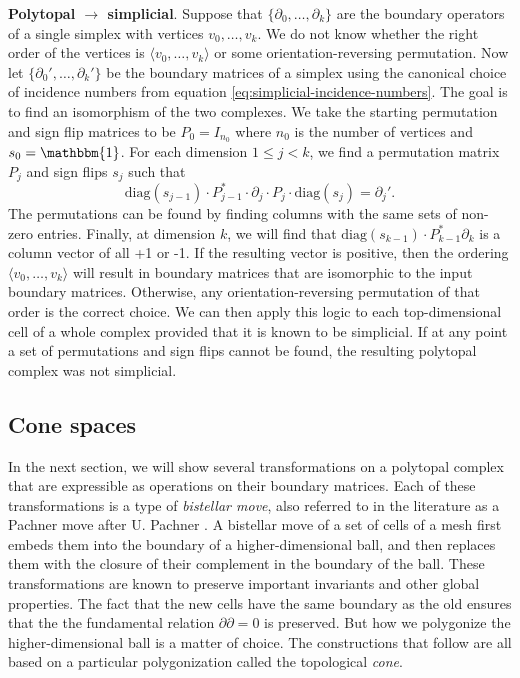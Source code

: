 \documentclass[twocolumn,leqno,twocolumn]{article}
\begin{document}
\textbf{Polytopal $\rightarrow$ simplicial}.
Suppose that $\{\partial_0, \ldots, \partial_k\}$ are the boundary operators of a single simplex with vertices $v_0, \ldots, v_k$.
We do not know whether the right order of the vertices is $\langle v_0,\ldots,v_k\rangle$ or some orientation-reversing permutation.
Now let $\{\partial_0',\ldots,\partial_k'\}$ be the boundary matrices of a simplex using the canonical choice of incidence numbers from equation \eqref{eq:simplicial-incidence-numbers}.
The goal is to find an isomorphism of the two complexes.
We take the starting permutation and sign flip matrices to be $P_0 = I_{n_0}$ where $n_0$ is the number of vertices and $s_0 = \mathbbm{1}$.
For each dimension $1 \le j < k$, we find a permutation matrix $P_j$ and sign flips $s_j$ such that
\begin{equation}
    \text{diag}(s_{j - 1})\cdot P_{j - 1}^*\cdot\partial_j \cdot P_j\cdot \text{diag}(s_j) = \partial_j'.
\end{equation}
The permutations can be found by finding columns with the same sets of non-zero entries.
Finally, at dimension $k$, we will find that $\text{diag}(s_{k - 1})\cdot P_{k - 1}^*\partial_k$ is a column vector of all +1 or -1.
If the resulting vector is positive, then the ordering $\langle v_0,\ldots,v_k\rangle$ will result in boundary matrices that are isomorphic to the input boundary matrices.
Otherwise, any orientation-reversing permutation of that order is the correct choice.
We can then apply this logic to each top-dimensional cell of a whole complex provided that it is known to be simplicial.
If at any point a set of permutations and sign flips cannot be found, the resulting polytopal complex was not simplicial.

\subsection{Cone spaces}

In the next section, we will show several transformations on a polytopal complex that are expressible as operations on their boundary matrices.
Each of these transformations is a type of \emph{bistellar move}, also referred to in the literature as a Pachner move after U. Pachner \cite{pachner1990shellings, pachner1991pl, casali1995note}.
A bistellar move of a set of cells of a mesh first embeds them into the boundary of a higher-dimensional ball, and then replaces them with the closure of their complement in the boundary of the ball.
These transformations are known to preserve important invariants and other global properties.
The fact that the new cells have the same boundary as the old ensures that the the fundamental relation $\partial\partial = 0$ is preserved.
But how we polygonize the higher-dimensional ball is a matter of choice.
The constructions that follow are all based on a particular polygonization called the topological \emph{cone}.
\end{document}
